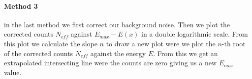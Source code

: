 \paragraph{Method 3} in the last method we first correct our background noise.
Then we plot the corrected counts $N_{eff}$ against $E_{max}-E(x)$ in a double logarithmic scale.
From this plot we calculate the slope $n$ to draw a new plot were we plot the $n$-th root of the corrected counts $N_{eff}$ against the energy $E$.
From this we get an extrapolated intersecting line were the counts are zero giving us a new 
$E_{max}$ value.






  